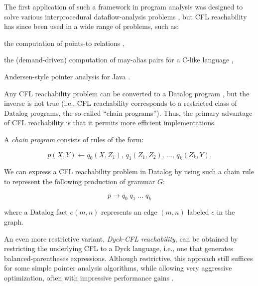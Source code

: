 The first application of such a framework in program analysis was
designed to solve various interprocedural dataflow-analysis problems
\cite{popl/RepsHS95}, but CFL reachability has since been used in a
wide range of problems, such as:
\begin{inparaenum}[(i)]
\item the computation of points-to relations
  \cite{journals/infsof/Reps98},
\item the (demand-driven) computation of may-alias pairs for a C-like
  language \cite{popl/ZhengR08},
\item Andersen-style pointer analysis for Java
  \cite{oopsla/SridharanGSB05}.
\end{inparaenum}

Any CFL reachability problem can be converted to a Datalog program
\cite{journals/infsof/Reps98}, but the inverse is not true (i.e., CFL
reachability corresponds to a restricted class of Datalog programs,
the so-called ``chain programs''). Thus, the primary advantage of CFL
reachability is that it permits more efficient implementations.

A \emph{chain program} consists of rules of the form:

\[p(X, Y) \leftarrow q_0(X,Z_1),\, q_1(Z_1, Z_2),\, \dots,\, q_k(Z_k,
  Y). \]

We can express a CFL reachability problem in Datalog by using such a
chain rule to represent the following production of grammar \(G\):

\[p \rightarrow q_0\; q_1\; \dots\; q_k \]

where a Datalog fact \(e(m, n)\) represents an edge \((m, n)\) labeled
\(e\) in the graph.

An even more restrictive variant, \emph{Dyck-CFL reachability}, can be
obtained by restricting the underlying CFL to a Dyck language, i.e.,
one that generates balanced-parentheses expressions. Although
restrictive, this approach still suffices for some simple pointer
analysis algorithms, while allowing very aggressive optimization,
often with impressive performance gains \cite{pldi/ZhangLYS13}.




